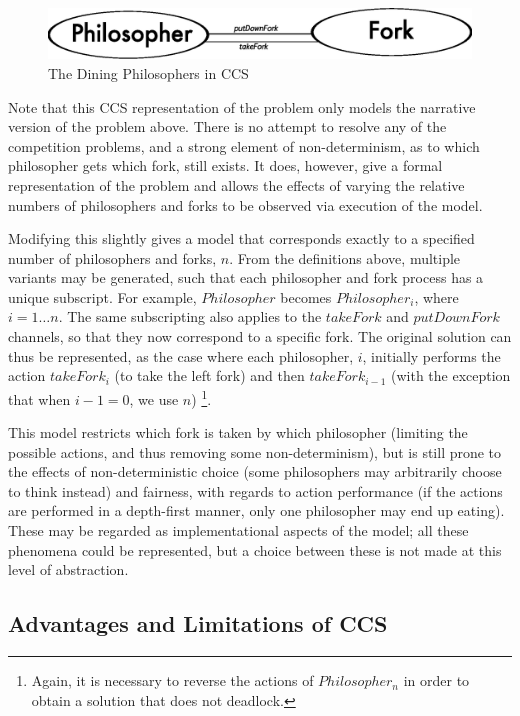 \begin{figure}  
  \centering
  \includegraphics[scale=0.5]{philosophers}
  \caption{The Dining Philosophers in CCS}
  \label{fig:dpccs}
\end{figure}

Note that this CCS representation of the problem only models the
narrative version of the problem above.  There is no attempt to
resolve any of the competition problems, and a strong element of
non-determinism, as to which philosopher gets which fork, still
exists.  It does, however, give a formal representation of the problem
and allows the effects of varying the relative numbers of philosophers
and forks to be observed via execution of the model.

Modifying this slightly gives a model that corresponds
exactly to a specified number of philosophers and forks, $n$.  From
the definitions above, multiple variants may be generated, such that
each philosopher and fork process has a unique subscript.  For
example, $Philosopher$ becomes $Philosopher_i$, where $i = 1\dots n$.
The same subscripting also applies to the $takeFork$ and $putDownFork$
channels, so that they now correspond to a specific fork.  The
original solution can thus be represented, as the case where each
philosopher, $i$, initially performs the action $takeFork_i$ (to take
the left fork) and then $takeFork_{i-1}$ (with the exception that when
$i-1 = 0$, we use $n$) \footnote{Again, it is necessary to reverse the
  actions of $Philosopher_n$ in order to obtain a solution that does not
  deadlock.}.

This model restricts which fork is taken by which philosopher
(limiting the possible actions, and thus removing some
non-determinism), but is still prone to the effects of
non-deterministic choice (some philosophers may arbitrarily choose to
think instead) and fairness, with regards to action performance (if
the actions are performed in a depth-first manner, only one
philosopher may end up eating).  These may be regarded as
implementational aspects of the model; all these phenomena could be
represented, but a choice between these is not made at this level of
abstraction.

\subsection{Advantages and Limitations of CCS}
\label{ccslimit}

